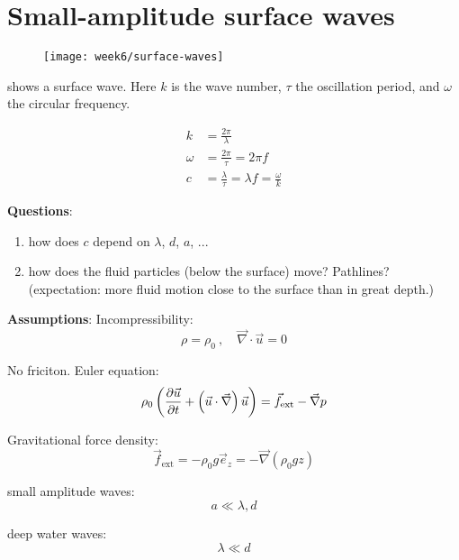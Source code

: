 \section{Small-amplitude surface waves}

\begin{figure}[!h]
    \centering
    \texttt{[image: week6/surface-waves]}\\
    \caption{}
    \label{fig:surface-waves}
\end{figure}

 shows a surface wave. Here $k$ is the wave number, $\tau$ the oscillation period, and $\omega$ the circular frequency.

\begin{align}
k &= \frac{2\pi}{\lambda}\\
\omega &= \frac{2\pi}{\tau} = 2\pi f\\
c &= \frac{\lambda}{\tau} = \lambda f = \frac{\omega}{k}
\end{align}

\textbf{Questions}:
\begin{enumerate}
\item how does $c$ depend on $\lambda$, $d$, $a$, ...
\item how does the fluid particles (below the surface) move? Pathlines? (expectation: more fluid motion close to the surface than in great depth.)
\end{enumerate}

\textbf{Assumptions}:
Incompressibility:
\begin{equation}
\rho=\rho_0\ ,\quad \vec{\nabla}\cdot\vec{u}=0
\end{equation}

No friciton. Euler equation:
\begin{equation}
\rho_0\left(\frac{\partial \vec{u}}{\partial t}+\left(\vec{u}\cdot\vec{\nabla}\right)\vec{u}\right) = \vec{f}_\mathrm{ext}-\vec{\nabla}p
\end{equation}

Gravitational force density:
\begin{equation}
\vec{f}_\mathrm{ext} = -\rho_0g\vec{e}_z = -\vec{\nabla}(\rho_0 gz)
\end{equation}

small amplitude waves:
\begin{equation}
a\ll \lambda,d
\end{equation}

deep water waves:
\begin{equation}
\lambda\ll d
\end{equation}

